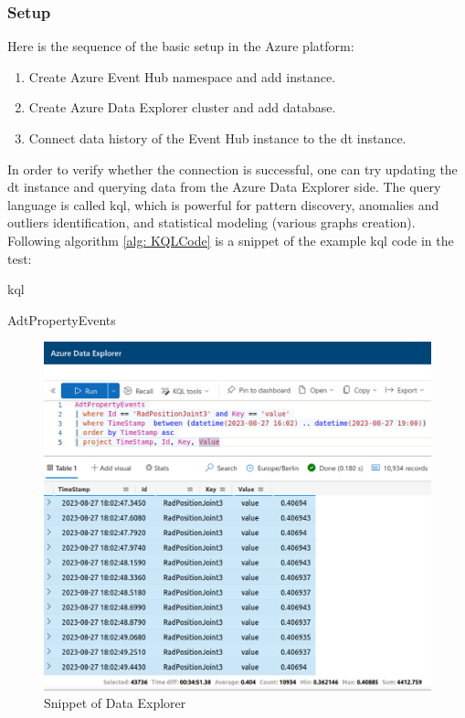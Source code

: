 \subsubsection{Setup}
Here is the sequence of the basic setup in the Azure platform:
\begin{enumerate}
    \item Create Azure Event Hub namespace and add instance.
    \item Create Azure Data Explorer cluster and add database.
    \item Connect data history of the Event Hub instance to the \gls{dt} instance.
\end{enumerate}

In order to verify whether the connection is successful, one can try updating the 
\gls{dt} instance and querying data from the Azure Data Explorer side. The query
language is called \gls{kql}, which is powerful for pattern discovery, anomalies 
and outliers identification, and statistical modeling (various graphs creation). 
Following algorithm \ref{alg: KQLCode} is a snippet of the example \gls{kql} code in the test: 

\begin{algorithm}
    \caption{\gls{kql}}
    \label{alg: KQLCode}
    \begin{algorithmic}
        \State  AdtPropertyEvents 
    \end{algorithmic}
\end{algorithm}


\begin{figure}[htb]
    \includegraphics[width=\textwidth]{figures/KQL_cut.jpg}
    
    \centering
    \caption{Snippet of Data Explorer\label{fig: KQL}}
\end{figure}


